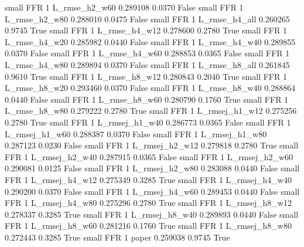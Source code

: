      small      FFR                 1  L_rmse_h2_w60   0.289108      0.0370   False
     small      FFR                 1  L_rmse_h2_w80   0.288010      0.0475   False
     small      FFR                 1  L_rmse_h4_all   0.260265      0.9745    True
     small      FFR                 1  L_rmse_h4_w12   0.278600      0.2780    True
     small      FFR                 1  L_rmse_h4_w20   0.285982      0.0440   False
     small      FFR                 1  L_rmse_h4_w40   0.289855      0.0370   False
     small      FFR                 1  L_rmse_h4_w60   0.288853      0.0365   False
     small      FFR                 1  L_rmse_h4_w80   0.289894      0.0370   False
     small      FFR                 1  L_rmse_h8_all   0.261845      0.9610    True
     small      FFR                 1  L_rmse_h8_w12   0.280843      0.2040    True
     small      FFR                 1  L_rmse_h8_w20   0.293460      0.0370   False
     small      FFR                 1  L_rmse_h8_w40   0.288864      0.0440   False
     small      FFR                 1  L_rmse_h8_w60   0.280790      0.1760    True
     small      FFR                 1  L_rmse_h8_w80   0.279222      0.2780    True
     small      FFR                 1 L_rmsej_h1_w12   0.275256      0.2780    True
     small      FFR                 1 L_rmsej_h1_w40   0.286773      0.0365   False
     small      FFR                 1 L_rmsej_h1_w60   0.288387      0.0370   False
     small      FFR                 1 L_rmsej_h1_w80   0.287123      0.0230   False
     small      FFR                 1 L_rmsej_h2_w12   0.279818      0.2780    True
     small      FFR                 1 L_rmsej_h2_w40   0.287915      0.0365   False
     small      FFR                 1 L_rmsej_h2_w60   0.290081      0.0125   False
     small      FFR                 1 L_rmsej_h2_w80   0.283088      0.0440   False
     small      FFR                 1 L_rmsej_h4_w12   0.275349      0.3285    True
     small      FFR                 1 L_rmsej_h4_w40   0.290200      0.0370   False
     small      FFR                 1 L_rmsej_h4_w60   0.289453      0.0440   False
     small      FFR                 1 L_rmsej_h4_w80   0.275296      0.2780    True
     small      FFR                 1 L_rmsej_h8_w12   0.278337      0.3285    True
     small      FFR                 1 L_rmsej_h8_w40   0.289893      0.0440   False
     small      FFR                 1 L_rmsej_h8_w60   0.281216      0.1760    True
     small      FFR                 1 L_rmsej_h8_w80   0.272443      0.3285    True
     small      FFR                 1          paper   0.259038      0.9745    True
